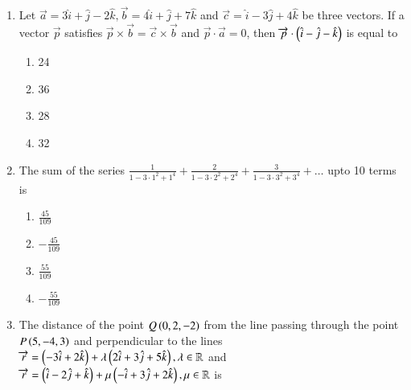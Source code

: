 \documentclass[journal]{IEEEtran}
\begin{document}
\begin{enumerate}
    \item Let $\overrightarrow{a} = 3\hat{i} + \hat{j} - 2\hat{k}, \overrightarrow{b} = 4\hat{i} + \hat{j} + 7\hat{k}$
    and $\overrightarrow{c} = \hat{i} - 3\hat{j} + 4\hat{k}$ be three vectors. If a
    vector $\overrightarrow{p}$ satisfies $\overrightarrow{p} \times \overrightarrow{b} = \overrightarrow{c} \times \overrightarrow{b}$
    and $\overrightarrow{p} \cdot \overrightarrow{a} = 0$, then $\overrightarrow{p} \cdot \left(\hat{i} - \hat{j} - \hat{k}\right)$
    is equal to

    \begin{multicols}{4}
\begin{enumerate}

        \item 24
        \item 36
        \item 28
        \item 32
    \end{enumerate}
\end{multicols}

    \item The sum of the series $\frac{1}{1-3\cdot 1^2+1^4}+\frac{2}{1-3\cdot 2^2+2^4}
    +\frac{3}{1-3\cdot 3^2+3^4} + \dots$ upto 10 terms is

    \begin{multicols}{4}
\begin{enumerate}

        \item $\frac{45}{109}$
        \item $-\frac{45}{109}$
        \item $\frac{55}{109}$
        \item $-\frac{55}{109}$
    \end{enumerate}
\end{multicols}

    \item The distance of the point $Q\left(0, 2, -2\right)$ from the line passing
    through the point $P\left(5, -4, 3\right)$ and perpendicular to the lines 
    $\overrightarrow{r} = \left(-3\hat{i} + 2\hat{k}\right) + \lambda\left(2\hat{i} + 3\hat{j} + 5\hat{k}\right), \lambda \in \mathbb{R}$
    and $\overrightarrow{r} = \left(\hat{i} - 2\hat{j} + \hat{k}\right) + \mu\left(-\hat{i} + 3\hat{j} + 2\hat{k}\right), \mu \in \mathbb{R}$
    is

    \begin{multicols}{4}
\begin{enumerate}


\end{enumerate}
\end{multicols}
\end{enumerate}
\end{document}
